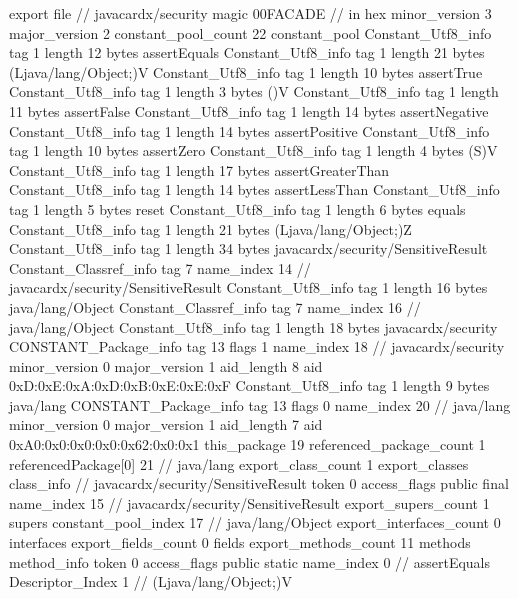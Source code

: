 export file {		// javacardx/security
	magic	00FACADE		 // in hex
	minor_version	3
	major_version	2
	constant_pool_count	22
	constant_pool {
		Constant_Utf8_info {
			tag	1
			length	12
			bytes	assertEquals
		}
		Constant_Utf8_info {
			tag	1
			length	21
			bytes	(Ljava/lang/Object;)V
		}
		Constant_Utf8_info {
			tag	1
			length	10
			bytes	assertTrue
		}
		Constant_Utf8_info {
			tag	1
			length	3
			bytes	()V
		}
		Constant_Utf8_info {
			tag	1
			length	11
			bytes	assertFalse
		}
		Constant_Utf8_info {
			tag	1
			length	14
			bytes	assertNegative
		}
		Constant_Utf8_info {
			tag	1
			length	14
			bytes	assertPositive
		}
		Constant_Utf8_info {
			tag	1
			length	10
			bytes	assertZero
		}
		Constant_Utf8_info {
			tag	1
			length	4
			bytes	(S)V
		}
		Constant_Utf8_info {
			tag	1
			length	17
			bytes	assertGreaterThan
		}
		Constant_Utf8_info {
			tag	1
			length	14
			bytes	assertLessThan
		}
		Constant_Utf8_info {
			tag	1
			length	5
			bytes	reset
		}
		Constant_Utf8_info {
			tag	1
			length	6
			bytes	equals
		}
		Constant_Utf8_info {
			tag	1
			length	21
			bytes	(Ljava/lang/Object;)Z
		}
		Constant_Utf8_info {
			tag	1
			length	34
			bytes	javacardx/security/SensitiveResult
		}
		Constant_Classref_info {
			tag	7
			name_index	14		// javacardx/security/SensitiveResult
		}
		Constant_Utf8_info {
			tag	1
			length	16
			bytes	java/lang/Object
		}
		Constant_Classref_info {
			tag	7
			name_index	16		// java/lang/Object
		}
		Constant_Utf8_info {
			tag	1
			length	18
			bytes	javacardx/security
		}
		CONSTANT_Package_info {
			tag	13
			flags	1
			name_index	18		// javacardx/security
			minor_version	0
			major_version	1
			aid_length	8
			aid	0xD:0xE:0xA:0xD:0xB:0xE:0xE:0xF
		}
		Constant_Utf8_info {
			tag	1
			length	9
			bytes	java/lang
		}
		CONSTANT_Package_info {
			tag	13
			flags	0
			name_index	20		// java/lang
			minor_version	0
			major_version	1
			aid_length	7
			aid	0xA0:0x0:0x0:0x0:0x62:0x0:0x1
		}
	}
	this_package	19
	referenced_package_count	1
	referencedPackage[0]	21		// java/lang
	export_class_count	1
	export_classes {
		class_info {		// javacardx/security/SensitiveResult
			token	0
			access_flags	public final
			name_index	15		// javacardx/security/SensitiveResult
			export_supers_count	1
			supers {
				constant_pool_index	17		// java/lang/Object
			}
			export_interfaces_count	0
			interfaces {
			}
			export_fields_count	0
			fields {
			}
			export_methods_count	11
			methods {
				method_info {
					token	0
					access_flags	public static
					name_index	0		// assertEquals
					Descriptor_Index	1		// (Ljava/lang/Object;)V
}}}}}
